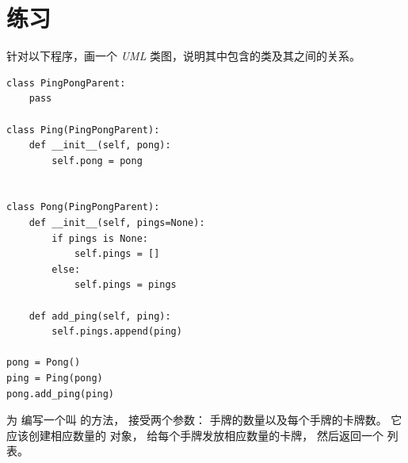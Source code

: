 \section{练习}

\begin{exercise}

针对以下程序，画一个 {\em UML} 类图，说明其中包含的类及其之间的关系。

\begin{em}
\begin{lstlisting}
class PingPongParent:
    pass

class Ping(PingPongParent):
    def __init__(self, pong):
        self.pong = pong


class Pong(PingPongParent):
    def __init__(self, pings=None):
        if pings is None:
            self.pings = []
        else:
            self.pings = pings

    def add_ping(self, ping):
        self.pings.append(ping)

pong = Pong()
ping = Ping(pong)
pong.add_ping(ping)
\end{lstlisting}
\end{em}

\end{exercise}


\begin{exercise}

为 {\em {}} 编写一个叫 {\em {}} 的方法， 接受两个参数： 手牌的数量以及每个手牌的卡牌数。
它应该创建相应数量的 {\em {}} 对象， 给每个手牌发放相应数量的卡牌，
然后返回一个 {\em {}} 列表。
\end{exercise}


